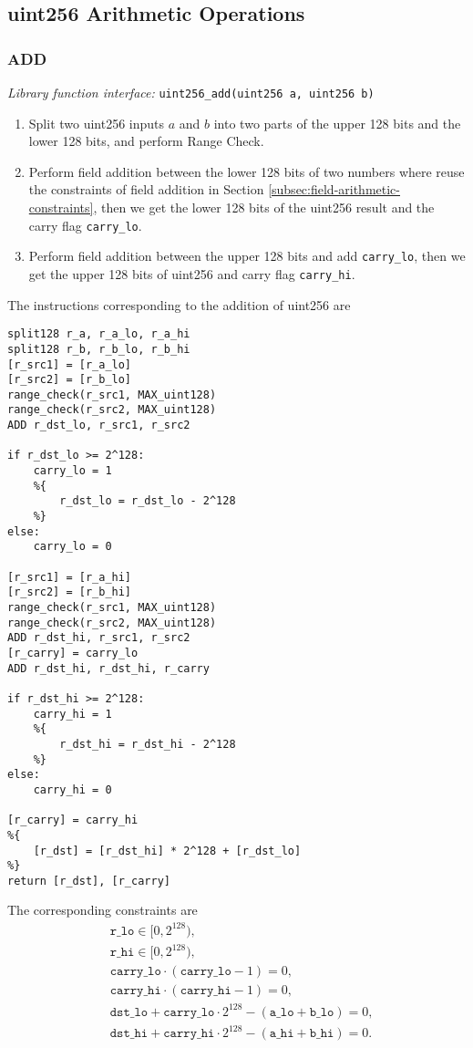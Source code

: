 \subsection{uint256 Arithmetic Operations}\label{subsec:uint256-arithmetic-operation}

\subsubsection{ADD}

\emph{Library function interface:} \verb|uint256_add(uint256 a, uint256 b)|

\begin{enumerate}
    \item Split two uint256 inputs $a$ and $b$ into two parts of the upper 128 bits and the lower 128 bits, and perform Range Check.
    \item Perform field addition between the lower 128 bits of two numbers where reuse the constraints of field addition in Section \ref{subsec:field-arithmetic-constraints}, then we get the lower 128 bits of the uint256 result and the carry flag \verb|carry_lo|.
    \item Perform field addition between the upper 128 bits and add \verb|carry_lo|, then we get the upper 128 bits of uint256 and carry flag \verb|carry_hi|.
\end{enumerate}

The instructions corresponding to the addition of uint256 are
\begin{lstlisting}[language={}]
split128 r_a, r_a_lo, r_a_hi
split128 r_b, r_b_lo, r_b_hi
[r_src1] = [r_a_lo]
[r_src2] = [r_b_lo]
range_check(r_src1, MAX_uint128)
range_check(r_src2, MAX_uint128)
ADD r_dst_lo, r_src1, r_src2

if r_dst_lo >= 2^128:
    carry_lo = 1
    %{
        r_dst_lo = r_dst_lo - 2^128
    %}
else:
    carry_lo = 0

[r_src1] = [r_a_hi]
[r_src2] = [r_b_hi]
range_check(r_src1, MAX_uint128)
range_check(r_src2, MAX_uint128)
ADD r_dst_hi, r_src1, r_src2
[r_carry] = carry_lo
ADD r_dst_hi, r_dst_hi, r_carry

if r_dst_hi >= 2^128:
    carry_hi = 1
    %{
        r_dst_hi = r_dst_hi - 2^128
    %}
else:
    carry_hi = 0

[r_carry] = carry_hi
%{
    [r_dst] = [r_dst_hi] * 2^128 + [r_dst_lo]
%}
return [r_dst], [r_carry]
\end{lstlisting}

The corresponding constraints are
\begin{align*}
    & \texttt{r\_lo} \in [0,2^{128}), \\
    & \texttt{r\_hi} \in [0,2^{128}), \\
    & \texttt{carry\_lo} \cdot (\texttt{carry\_lo} - 1) = 0, \\
    & \texttt{carry\_hi} \cdot (\texttt{carry\_hi} - 1) = 0, \\
    & \texttt{dst\_lo} + \texttt{carry\_lo} \cdot 2^{128} - (\texttt{a\_lo} + \texttt{b\_lo}) = 0, \\
    & \texttt{dst\_hi} + \texttt{carry\_hi} \cdot 2^{128} - (\texttt{a\_hi} + \texttt{b\_hi}) = 0.
\end{align*}

